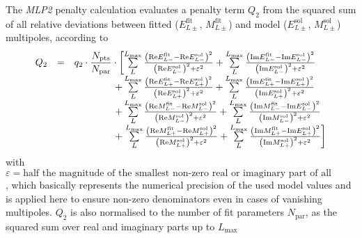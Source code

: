 \documentclass[a4paper,10pt]{article}
\def\Re{\mathrm{Re}}
\def\Im{\mathrm{Im}}
\begin{document}
The \textit{MLP2} penalty calculation evaluates a penalty term $Q_2$ from the squared sum of all relative deviations
between fitted 
(${E}_{L\pm}^\mathrm{fit}$, ${M}_{L\pm}^\mathrm{fit}$)
and model
(${E}_{L\pm}^\mathrm{sol}$, ${M}_{L\pm}^\mathrm{sol}$)
multipoles, according to
\begin{displaymath}
\begin{array}{lcl}
 Q_2 &=& q_2\cdot \dfrac{N_\mathrm{pts}}{N_\mathrm{par}} \cdot \left[
\sum\limits_L^{L_\mathrm{max}}
\frac{\left(\Re E_{L-}^\mathrm{fit} - \Re E_{L-}^\mathrm{sol}\right)^2}
{\left(\Re E_{L-}^\mathrm{sol}\right)^2 + \varepsilon^2}
+
\sum\limits_L^{L_\mathrm{max}}
\frac{\left(\Im E_{L-}^\mathrm{fit} - \Im E_{L-}^\mathrm{sol}\right)^2}
{\left(\Im E_{L-}^\mathrm{sol}\right)^2 + \varepsilon^2}\right.\\
&&\hspace{4.19em}+
\sum\limits_L^{L_\mathrm{max}}
\frac{\left(\Re E_{L+}^\mathrm{fit} - \Re E_{L+}^\mathrm{sol}\right)^2}
{\left(\Re E_{L+}^\mathrm{sol}\right)^2 + \varepsilon^2}
+
\sum\limits_L^{L_\mathrm{max}}
\frac{\left(\Im E_{L+}^\mathrm{fit} - \Im E_{L+}^\mathrm{sol}\right)^2}
{\left(\Im E_{L+}^\mathrm{sol}\right)^2 + \varepsilon^2}\\
&&\hspace{4.19em}+
\sum\limits_L^{L_\mathrm{max}}
\frac{\left(\Re M_{L-}^\mathrm{fit} - \Re M_{L-}^\mathrm{sol}\right)^2}
{\left(\Re M_{L-}^\mathrm{sol}\right)^2 + \varepsilon^2}
+
\sum\limits_L^{L_\mathrm{max}}
\frac{\left(\Im M_{L-}^\mathrm{fit} - \Im E_{L-}^\mathrm{sol}\right)^2}
{\left(\Im M_{L-}^\mathrm{sol}\right)^2 + \varepsilon^2}\\
&&\hspace{4.19em}+\left.
\sum\limits_L^{L_\mathrm{max}}
\frac{\left(\Re M_{L+}^\mathrm{fit} - \Re M_{L+}^\mathrm{sol}\right)^2}
{\left(\Re M_{L+}^\mathrm{sol}\right)^2 + \varepsilon^2}
+
\sum\limits_L^{L_\mathrm{max}}
\frac{\left(\Im M_{L+}^\mathrm{fit} - \Im E_{L+}^\mathrm{sol}\right)^2}
{\left(\Im M_{L+}^\mathrm{sol}\right)^2 + \varepsilon^2}
\right]
\end{array}
\end{displaymath}
with
$\varepsilon = \mbox{half the magnitude of the smallest non-zero real or imaginary part of all multipoles}$,
which basically represents the numerical precision of the used model values and is applied here to ensure
non-zero denominators even in cases of vanishing multipoles.
$Q_2$ is also normalised
to the number of fit parameters $N_\mathrm{par}$, as the squared sum over real and imaginary parts up to $L_\mathrm{max}$
\end{document}
